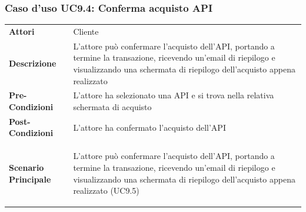 \subsubsection{Caso d'uso UC9.4: Conferma acquisto API}
\label{UC9_4}

\begin{minipage}{\linewidth}
	\begin{tabular}{ l | p{11cm}}
		\hline
		\rowcolor{Gray}
		\multicolumn{2}{c}{UC9.4 - Conferma acquisto API} \\
		\hline
		\textbf{Attori} & Cliente \\
		\textbf{Descrizione} & L'attore può confermare l'acquisto dell'API, portando a termine la transazione, ricevendo un'email di riepilogo e visualizzando una schermata di riepilogo dell'acquisto appena realizzato \\
		\textbf{Pre-Condizioni} & L'attore ha selezionato una API e si trova nella relativa schermata di acquisto \\
		\textbf{Post-Condizioni} & L'attore ha confermato l'acquisto dell'API \\
		\textbf{Scenario Principale} & 
		\begin{enumerate*}[label=(\arabic*.),itemjoin={\newline}]
			\item L'attore può confermare l'acquisto dell'API, portando a termine la transazione, ricevendo un'email di riepilogo e visualizzando una schermata di riepilogo dell'acquisto appena realizzato (UC9.5)
		\end{enumerate*}\\
	\end{tabular}
\end{minipage}

\newpage
